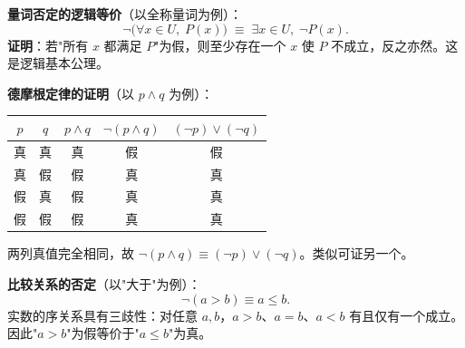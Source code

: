 \begin{proofbox}
\textbf{量词否定的逻辑等价}（以全称量词为例）：
\[
\lnot\big(\forall x\in U,\;P(x)\big) \;\equiv\; \exists x\in U,\;\lnot P(x).
\]
\textbf{证明}：若"所有 $x$ 都满足 $P$"为假，则至少存在一个 $x$ 使 $P$ 不成立，反之亦然。这是逻辑基本公理。
\end{proofbox}

\begin{proofbox}
\textbf{德摩根定律的证明}（以 $p\land q$ 为例）：
\begin{center}
\begin{tabular}{|c|c|c|c|c|}
\hline
$p$ & $q$ & $p\land q$ & $\lnot(p\land q)$ & $(\lnot p)\lor(\lnot q)$ \\ \hline
真 & 真 & 真 & 假 & 假 \\
真 & 假 & 假 & 真 & 真 \\
假 & 真 & 假 & 真 & 真 \\
假 & 假 & 假 & 真 & 真 \\ \hline
\end{tabular}
\end{center}
两列真值完全相同，故 $\lnot(p\land q) \equiv (\lnot p)\lor(\lnot q)$。类似可证另一个。
\end{proofbox}

\begin{proofbox}
\textbf{比较关系的否定}（以"大于"为例）：
\[
\lnot(a>b) \equiv a\le b.
\]
实数的序关系具有三歧性：对任意 $a,b$，$a>b$、$a=b$、$a<b$ 有且仅有一个成立。因此"$a>b$"为假等价于"$a\le b$"为真。
\end{proofbox}